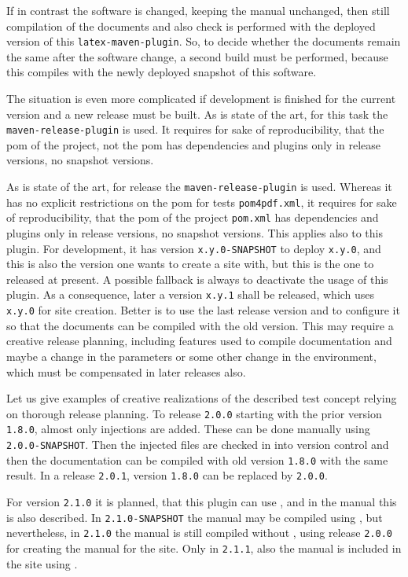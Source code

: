 If in contrast the software is changed, keeping the manual unchanged, 
then still compilation of the documents and also check 
is performed with the deployed version of this \texttt{latex-maven-plugin}. 
So, to decide whether the documents remain the same after the software change, 
a second build must be performed, 
because this compiles with the newly deployed snapshot of this software. 



The situation is even more complicated 
if development is finished for the current version 
and a new release must be built. 
As is state of the art, 
for this task the \texttt{maven-release-plugin} is used. 
It requires for sake of reproducibility, 
that the pom of the project, not the pom  has dependencies and plugins only in release versions, 
no snapshot versions. 

As is state of the art, 
for release the \texttt{maven-release-plugin} is used. 
Whereas it has no explicit restrictions on the pom for tests \texttt{pom4pdf.xml}, 
it requires for sake of reproducibility, 
that the pom of the project \texttt{pom.xml} has dependencies and plugins 
only in release versions, no snapshot versions. 
This applies also to this plugin. 
For development, it has version \texttt{x.y.0-SNAPSHOT} 
to deploy \texttt{x.y.0}, and this is also the version one wants to create a site with, 
but this is the one to released at present. 
A possible fallback is always to deactivate the usage of this plugin. 
As a consequence, later a version \texttt{x.y.1} shall be released, 
which uses \texttt{x.y.0} for site creation. 
Better is to use the last release version and to configure it so 
that the documents can be compiled with the old version. 
This may require a creative release planning, including features used to compile documentation 
and maybe a change in the parameters or some other change in the environment, 
which must be compensated in later releases also. 

Let us give examples of creative realizations of the described test concept 
relying on thorough release planning. 
To release \texttt{2.0.0} starting with the prior version \texttt{1.8.0}, 
almost only injections are added. 
These can be done manually using \texttt{2.0.0-SNAPSHOT}. 
Then the injected files are checked in into version control 
and then the documentation can be compiled with old version \texttt{1.8.0} 
with the same result. 
In a release \texttt{2.0.1}, version \texttt{1.8.0} can be replaced by \texttt{2.0.0}. 

For version \texttt{2.1.0} it is planned, that this plugin can use , 
and in the manual this is also described. 
In \texttt{2.1.0-SNAPSHOT} the manual may be compiled using , 
but nevertheless, in \texttt{2.1.0} the manual is still compiled without , 
using release \texttt{2.0.0} for creating the manual for the site. 
Only in \texttt{2.1.1}, also the manual is included in the site using . 

